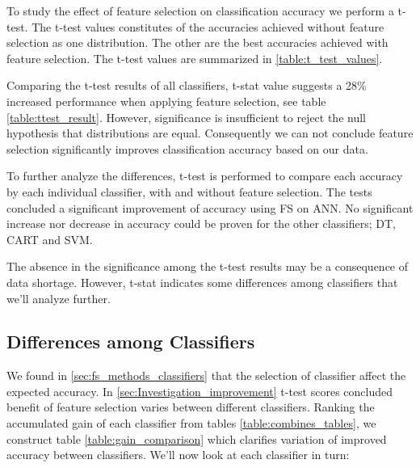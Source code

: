 To study the effect of feature selection on classification accuracy we perform a t-test. The t-test values constitutes of the accuracies achieved without feature selection as one distribution. The other are the best accuracies achieved with feature selection. The t-test values are summarized in \ref{table:t_test_values}.



Comparing the t-test results of all classifiers, t-stat value suggests a 28\% increased performance when applying feature selection, see table \ref{table:ttest_result}. However, significance is insufficient to reject the null hypothesis that distributions are equal. Consequently we can not conclude feature selection significantly improves classification accuracy based on our data.

To further analyze the differences, t-test is performed to compare each accuracy by each individual classifier, with and without feature selection. The tests concluded a significant improvement of accuracy using FS on ANN. No significant increase nor decrease in accuracy could be proven for the other classifiers; DT, CART and SVM.



The absence in the significance among the t-test results may be a consequence of data shortage. However, t-stat indicates some differences among classifiers that we'll analyze further.

\FloatBarrier
\subsection{Differences among Classifiers}

We found in \ref{sec:fs_methods_classifiers} that the selection of classifier affect the expected accuracy. In \ref{sec:Investigation_improvement} t-test scores concluded benefit of feature selection varies between different classifiers. Ranking the accumulated gain of each classifier from tables \ref{table:combines_tables}, we construct table \ref{table:gain_comparison} which clarifies variation of improved accuracy between classifiers. We'll now look at each classifier in turn:

\begin{table}[hp]
  
  \caption[]%
  {{\small Ranking of which classifiers gained most accuracy when comparing feature selection to full dataset.}}
  \label{table:gain_comparison}
\end{table}

